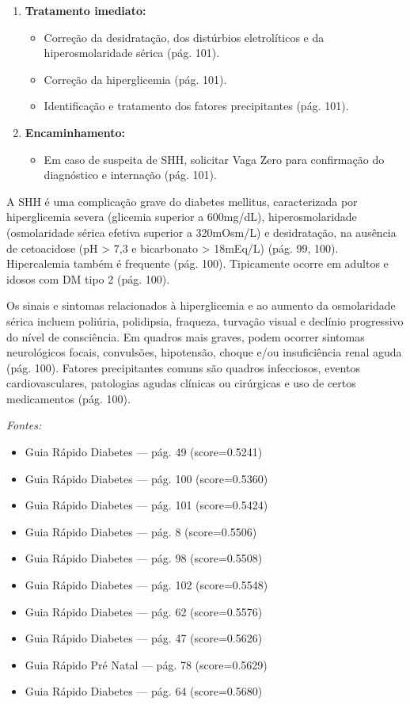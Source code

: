 \documentclass[conference,a4paper]{IEEEtran}
\begin{document}
\begin{enumerate}
  \item \textbf{Tratamento imediato:}
  \begin{itemize}
    \item Correção da desidratação, dos distúrbios eletrolíticos
          e da hiperosmolaridade sérica (pág. 101).
    \item Correção da hiperglicemia (pág. 101).
    \item Identificação e tratamento dos fatores precipitantes
          (pág. 101).
  \end{itemize}
  \item \textbf{Encaminhamento:}
  \begin{itemize}
    \item Em caso de suspeita de SHH, solicitar Vaga Zero para
          confirmação do diagnóstico e internação (pág. 101).
  \end{itemize}
\end{enumerate}

A SHH é uma complicação grave do diabetes mellitus, caracterizada
por hiperglicemia severa (glicemia superior a 600mg/dL),
hiperosmolaridade (osmolaridade sérica efetiva superior a
320mOsm/L) e desidratação, na ausência de cetoacidose (pH > 7,3
e bicarbonato > 18mEq/L) (pág. 99, 100). Hipercalemia também é
frequente (pág. 100). Tipicamente ocorre em adultos e idosos com
DM tipo 2 (pág. 100).

Os sinais e sintomas relacionados à hiperglicemia e ao aumento da
osmolaridade sérica incluem poliúria, polidipsia, fraqueza,
turvação visual e declínio progressivo do nível de consciência.
Em quadros mais graves, podem ocorrer sintomas neurológicos
focais, convulsões, hipotensão, choque e/ou insuficiência renal
aguda (pág. 100). Fatores precipitantes comuns são quadros
infecciosos, eventos cardiovasculares, patologias agudas clínicas
ou cirúrgicas e uso de certos medicamentos (pág. 100).

\textit{Fontes:}
\begin{itemize}
  \item {Guia Rápido Diabetes} --- pág. 49 (score=0.5241)
  \item {Guia Rápido Diabetes} --- pág. 100 (score=0.5360)
  \item {Guia Rápido Diabetes} --- pág. 101 (score=0.5424)
  \item {Guia Rápido Diabetes} --- pág. 8 (score=0.5506)
  \item {Guia Rápido Diabetes} --- pág. 98 (score=0.5508)
  \item {Guia Rápido Diabetes} --- pág. 102 (score=0.5548)
  \item {Guia Rápido Diabetes} --- pág. 62 (score=0.5576)
  \item {Guia Rápido Diabetes} --- pág. 47 (score=0.5626)
  \item {Guia Rápido Pré Natal} --- pág. 78 (score=0.5629)
  \item {Guia Rápido Diabetes} --- pág. 64 (score=0.5680)
\end{itemize}
\end{document}
